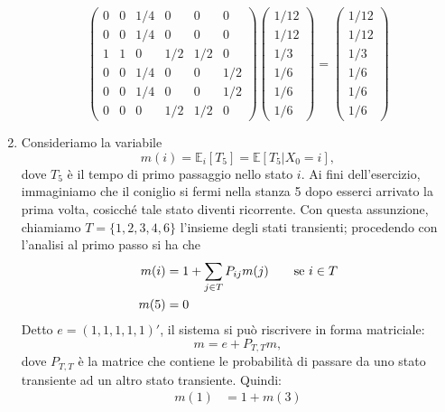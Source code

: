 \documentclass[
	12pt, %
]{fphw}
\begin{document}
\begin{enumerate}
	\begin{equation*}
		\begin{pmatrix}
			0 & 0 & 1/4 & 0 & 0 & 0\\
			0 & 0 & 1/4 & 0 & 0 & 0\\
			1 & 1 & 0 & 1/2 & 1/2 & 0\\
			0 & 0 & 1/4 & 0 & 0 & 1/2\\
			0 & 0 & 1/4 & 0 & 0 & 1/2\\
			0 & 0 & 0 & 1/2 & 1/2 & 0
		\end{pmatrix}
		\begin{pmatrix}
			1/12 \\ 1/12 \\ 1/3 \\ 1/6 \\ 1/6 \\ 1/6
		\end{pmatrix}
		=
		\begin{pmatrix}
			1/12 \\ 1/12 \\ 1/3 \\ 1/6 \\ 1/6 \\ 1/6
		\end{pmatrix}
	\end{equation*}
	\item Consideriamo la variabile
	\begin{equation*}
		m(i) = \mathbb{E}_i [T_5] = \mathbb{E}[T_5 | X_0 = i],
	\end{equation*}
	dove $T_5$ è il tempo di primo passaggio nello stato $i$.
	Ai fini dell'esercizio, immaginiamo che il coniglio si fermi nella stanza 5 dopo esserci arrivato la prima volta, cosicché tale stato diventi ricorrente. Con questa assunzione, chiamiamo $T = \{1, 2, 3, 4, 6\}$ l'insieme degli stati transienti; procedendo con l'analisi al primo passo si ha che
	\begin{align*}
		m(i) &= 1 + \sum_{j \in T} P_{ij}m(j) \qquad \textnormal{se } i \in T \\
		m(5) &= 0
	\end{align*}
	Detto $e = (1, 1, 1, 1, 1)'$, il sistema si può riscrivere in forma matriciale:
	\begin{equation*}
		m = e + P_{T,T}m,
	\end{equation*}
	dove $P_{T,T}$ è la matrice che contiene le probabilità di passare da uno stato transiente ad un altro stato transiente.
	Quindi:
	\begin{align*}
		m(1) &= 1 + m(3)\\

\end{align*}
\end{enumerate}
\end{document}
